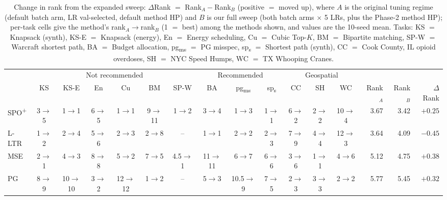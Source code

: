 \begin{table}[t]
\centering
\scriptsize
\caption{Change in rank from the expanded sweep: $\Delta$Rank $=$ Rank$_A-$Rank$_B$ (positive $=$ moved up), where $A$ is the original tuning regime (default batch arm, LR val-selected, default method HP) and $B$ is our full sweep (both batch arms $\times$ 5 LRs, plus the Phase-2 method HP); per-task cells give the method's rank$_A\rightarrow$rank$_B$ (1 $=$ best) among the methods shown, and values are the 10-seed mean. Tasks: KS $=$ Knapsack (synth), KS-E $=$ Knapsack (energy), En $=$ Energy scheduling, Cu $=$ Cubic Top-$K$, BM $=$ Bipartite matching, SP-W $=$ Warcraft shortest path, BA $=$ Budget allocation, pg\textsubscript{ms} $=$ PG misspec, sp\textsubscript{s} $=$ Shortest path (synth), CC $=$ Cook County, IL opioid overdoses, SH $=$ NYC Speed Humps, WC $=$ TX Whooping Cranes.}
\label{tab:notrec-rec-geo-spw-rank-change-mean-paper}
\setlength{\tabcolsep}{2pt}
\renewcommand{\arraystretch}{1.1}
\begin{tabular}{@{}lccccccccccccrrr@{}}
\toprule
 & \multicolumn{6}{c}{Not recommended} & \multicolumn{3}{c}{Recommended} & \multicolumn{3}{c}{Geospatial} &  &  &  \\
\cmidrule(lr){2-7}\cmidrule(lr){8-10}\cmidrule(lr){11-13}
 & KS & KS-E & En & Cu & BM & SP-W & BA & pg\textsubscript{ms} & sp\textsubscript{s} & CC & SH & WC & Rank$_A$ & Rank$_B$ & $\Delta$Rank \\
\midrule
SPO\textsuperscript{+} & 3$\rightarrow$5 & 1$\rightarrow$1 & 6$\rightarrow$5 & 1$\rightarrow$1 & 9$\rightarrow$11 & 1$\rightarrow$2 & 3$\rightarrow$4 & 1$\rightarrow$3 & 1$\rightarrow$1 & 6$\rightarrow$2 & 2$\rightarrow$2 & 10$\rightarrow$4 & 3.67 & 3.42 & $+0.25$ \\
L-LTR & 1$\rightarrow$2 & 2$\rightarrow$4 & 5$\rightarrow$6 & 2$\rightarrow$3 & 2$\rightarrow$8 & -- & 1$\rightarrow$1 & 2$\rightarrow$2 & 2$\rightarrow$3 & 7$\rightarrow$9 & 4$\rightarrow$4 & 12$\rightarrow$3 & 3.64 & 4.09 & $-0.45$ \\
MSE & 2$\rightarrow$1 & 4$\rightarrow$3 & 8$\rightarrow$8 & 5$\rightarrow$2 & 7$\rightarrow$5 & 4.5$\rightarrow$1 & 11$\rightarrow$11 & 6$\rightarrow$7 & 6$\rightarrow$6 & 3$\rightarrow$6 & 1$\rightarrow$1 & 4$\rightarrow$6 & 5.12 & 4.75 & $+0.38$ \\
PG & 8$\rightarrow$9 & 10$\rightarrow$10 & 3$\rightarrow$2 & 12$\rightarrow$12 & 1$\rightarrow$2 & -- & 5$\rightarrow$3 & 10.5$\rightarrow$9 & 7$\rightarrow$5 & 2$\rightarrow$3 & 3$\rightarrow$3 & 2$\rightarrow$2 & 5.77 & 5.45 & $+0.32$ \\

\end{tabular}
\end{table}
